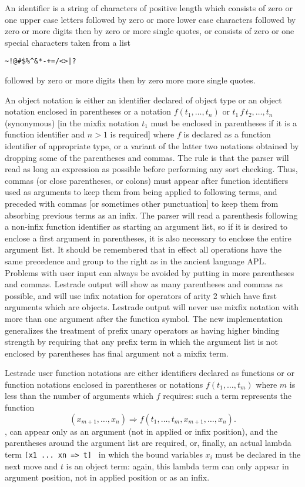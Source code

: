 \documentclass[12pt]{article}
\begin{document}
An identifier is a string of characters of positive length which consists of zero or one upper case letters followed by zero or more lower case characters followed by zero or more digits then by zero or more single quotes, or consists of zero or one special characters taken from a list      \begin{verbatim}
~!@#$%^&*-+=/<>|?

\end{verbatim} followed by zero or more digits then by zero more more single quotes.

An object notation is either an identifier declared of object type or an object notation enclosed in parentheses or a notation $f(t_1,\ldots,t_n)$  or $t_1\, f \,t_2,\ldots,t_n$ (synonymous) [in the mixfix notation  $t_1$ must be enclosed in parentheses if it is a function identifier and $n>1$ is required]  where
$f$ is declared as a function identifier of appropriate type, or a variant of the latter two notations obtained by dropping some of the parentheses and commas.  The rule is that the parser will read as long an expression as possible before performing any sort checking.  Thus, commas (or close parentheses, or colons) must appear after function
identifiers used as arguments to keep them from being applied to following terms, and preceded with commas [or sometimes other punctuation]  to keep them from absorbing previous terms as an infix.  The parser will read a parenthesis following a non-infix function identifier as starting an argument list, so if it is desired to enclose a first argument in parentheses, it is also necessary to enclose the entire argument list.  It should be remembered that in effect all operations have the same precedence and group to the right as in the ancient language APL.  Problems with user input can always be avoided by putting in more parentheses and commas.  Lestrade output will show as many parentheses and commas as possible, and will use infix notation for operators of arity 2 which have first arguments which are objects.  Lestrade output will never use mixfix notation with more than one argument after the function symbol.  The new implementation generalizes the treatment of prefix unary operators as having higher binding strength by requiring that any prefix term in which the argument list is not enclosed by parentheses has final argument not a mixfix term. 

Lestrade user function notations are either identifiers declared as functions or or function notations enclosed in parentheses or notations $f(t_1,\ldots,t_m)$ where $m$ is less than the number of arguments which $f$ requires:  such a term represents the function $$(x_{m+1},\ldots,x_n) \Rightarrow f(t_1,\ldots,t_m,x_{m+1},\ldots,x_n).$$, can appear only as an argument (not in applied or infix position), and the parentheses around the argument list are required, or, finally, an actual lambda term {\tt [x1 ... xn => t] } in which the bound variables $x_i$ must be declared in the next move and $t$ is an object term:  again, this lambda term can only appear in argument position, not in applied position or as an infix. 
\end{document}
